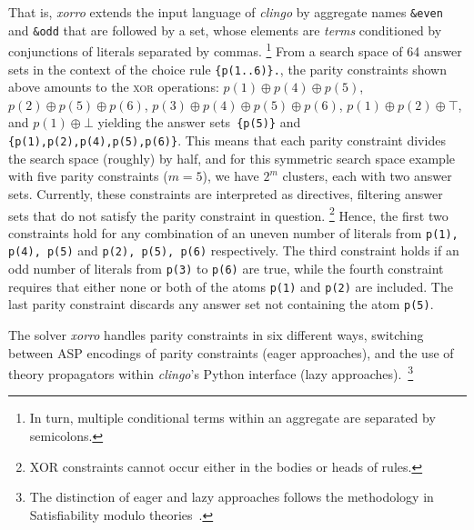 \documentclass{svproc}
\newcommand{\XOR}{\textsc{xor}} %
\newcommand{\sysfont}{\textit}
\newcommand{\clingo}{\sysfont{clingo}}
\newcommand{\xorro}{\sysfont{xorro}}
\newcommand{\xor}{\oplus}
\newcommand{\set}[1]{\{#1\}}
\begin{document}
%
That is, \xorro{} extends the input language of \clingo{} by
aggregate names \texttt{\&even} and \texttt{\&odd} that are followed
by a set, whose elements are \emph{terms} conditioned by
conjunctions of literals separated by commas.%
%
\footnote{In turn, multiple conditional terms within an aggregate are
	separated by semicolons.}
%
From a search space of 64 answer sets in the context of the choice rule \texttt{\set{p(1..6)}.}, the parity constraints shown above
amounts to the \XOR{} operations:
$p(1) \xor p(4) \xor p(5)$, $p(2) \xor p(5) \xor p(6)$, $p(3) \xor p(4) \xor p(5) \xor p(6)$, $p(1) \xor p(2) \xor \top$, and $p(1) \xor \bot$
yielding the answer sets~\texttt{\set{p(5)}} and \texttt{\set{p(1),p(2),p(4),p(5),p(6)}}.
This means that each parity constraint divides the search space (roughly) by half, and for this symmetric search space example with five parity constraints ($m=5$),
we have $2^m$ clusters, each with two answer sets.
%
Currently, these constraints are interpreted as directives,
filtering answer sets that do not satisfy the parity constraint in question.
\footnote{XOR constraints cannot occur either in the bodies or heads of rules.}
%
Hence, the first two
constraints hold for any combination of an uneven number of literals from \texttt{p(1), p(4), p(5)} and \texttt{p(2), p(5), p(6)} respectively.
The third constraint holds if an odd number of literals from \texttt{p(3)} to \texttt{p(6)} are true, while the fourth constraint requires that either none or both of
the atoms \texttt{p(1)} and \texttt{p(2)} are included.
The last parity constraint discards any answer set not containing the atom \texttt{p(5)}.

The solver \xorro{} handles parity constraints in six different ways,
switching between ASP encodings of parity constraints (eager approaches), and the use of theory propagators within \clingo{}'s Python interface (lazy approaches).~\footnote{The distinction of eager and lazy approaches follows the methodology in Satisfiability modulo theories~\cite{baseseti09a}.}
\end{document}
